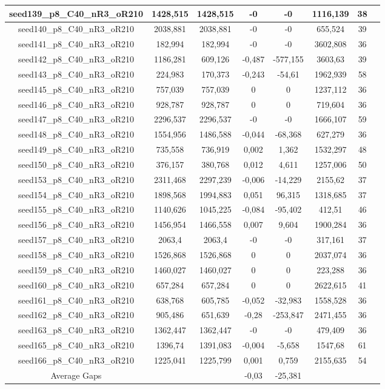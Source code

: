 \documentclass[a4paper]{article}
\begin{document}
\begin{center}
\begin{longtable}{cccccccc}
\hline
seed139\_p8\_C40\_nR3\_oR210 & 1428,515 & 1428,515 & -0 & -0 & 1116,139 & 38\\
\hline
seed140\_p8\_C40\_nR3\_oR210 & 2038,881 & 2038,881 & -0 & -0 & 655,524 & 39\\
\hline
seed141\_p8\_C40\_nR3\_oR210 & 182,994 & 182,994 & -0 & -0 & 3602,808 & 36\\
\hline
seed142\_p8\_C40\_nR3\_oR210 & 1186,281 & 609,126 & -0,487 & -577,155 & 3603,63 & 39\\
\hline
seed143\_p8\_C40\_nR3\_oR210 & 224,983 & 170,373 & -0,243 & -54,61 & 1962,939 & 58\\
\hline
seed145\_p8\_C40\_nR3\_oR210 & 757,039 & 757,039 & 0 & 0 & 1237,112 & 36\\
\hline
seed146\_p8\_C40\_nR3\_oR210 & 928,787 & 928,787 & 0 & 0 & 719,604 & 36\\
\hline
seed147\_p8\_C40\_nR3\_oR210 & 2296,537 & 2296,537 & -0 & -0 & 1666,107 & 59\\
\hline
seed148\_p8\_C40\_nR3\_oR210 & 1554,956 & 1486,588 & -0,044 & -68,368 & 627,279 & 36\\
\hline
seed149\_p8\_C40\_nR3\_oR210 & 735,558 & 736,919 & 0,002 & 1,362 & 1532,297 & 48\\
\hline
seed150\_p8\_C40\_nR3\_oR210 & 376,157 & 380,768 & 0,012 & 4,611 & 1257,006 & 50\\
\hline
seed153\_p8\_C40\_nR3\_oR210 & 2311,468 & 2297,239 & -0,006 & -14,229 & 2155,62 & 37\\
\hline
seed154\_p8\_C40\_nR3\_oR210 & 1898,568 & 1994,883 & 0,051 & 96,315 & 1318,685 & 37\\
\hline
seed155\_p8\_C40\_nR3\_oR210 & 1140,626 & 1045,225 & -0,084 & -95,402 & 412,51 & 46\\
\hline
seed156\_p8\_C40\_nR3\_oR210 & 1456,954 & 1466,558 & 0,007 & 9,604 & 1900,284 & 36\\
\hline
seed157\_p8\_C40\_nR3\_oR210 & 2063,4 & 2063,4 & -0 & -0 & 317,161 & 37\\
\hline
seed158\_p8\_C40\_nR3\_oR210 & 1526,868 & 1526,868 & 0 & 0 & 2037,074 & 36\\
\hline
seed159\_p8\_C40\_nR3\_oR210 & 1460,027 & 1460,027 & 0 & 0 & 223,288 & 36\\
\hline
seed160\_p8\_C40\_nR3\_oR210 & 657,284 & 657,284 & 0 & 0 & 2622,615 & 41\\
\hline
seed161\_p8\_C40\_nR3\_oR210 & 638,768 & 605,785 & -0,052 & -32,983 & 1558,528 & 36\\
\hline
seed162\_p8\_C40\_nR3\_oR210 & 905,486 & 651,639 & -0,28 & -253,847 & 2471,455 & 36\\
\hline
seed163\_p8\_C40\_nR3\_oR210 & 1362,447 & 1362,447 & -0 & -0 & 479,409 & 36\\
\hline
seed165\_p8\_C40\_nR3\_oR210 & 1396,74 & 1391,083 & -0,004 & -5,658 & 1547,68 & 61\\
\hline
seed166\_p8\_C40\_nR3\_oR210 & 1225,041 & 1225,799 & 0,001 & 0,759 & 2155,635 & 54\\
\hline
\hline
Average Gaps & & & -0,03 & -25,381 & & \\
\hline
\hline
\end{longtable}
\end{center}
\end{document}
